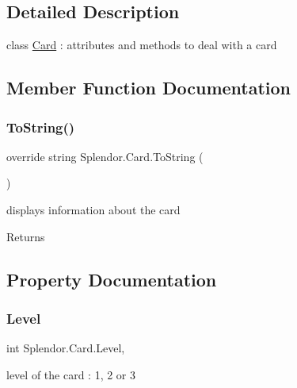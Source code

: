 \subsection{Detailed Description}
class \hyperlink{class_splendor_1_1_card}{Card} \+: attributes and methods to deal with a card 



\subsection{Member Function Documentation}
\mbox{\label{class_splendor_1_1_card_a3403c28ee02b119ee5aae5bd10eee468}} 
\subsubsection{\texorpdfstring{To\+String()}{ToString()}}
{\footnotesize\ttfamily override string Splendor.\+Card.\+To\+String (\begin{DoxyParamCaption}{ }\end{DoxyParamCaption})}



displays information about the card 

\begin{DoxyReturn}{Returns}

\end{DoxyReturn}


\subsection{Property Documentation}
\mbox{\label{class_splendor_1_1_card_aadc9953aeb322c82e04fbd9b5a3b996d}} 
\subsubsection{\texorpdfstring{Level}{Level}}
{\footnotesize\ttfamily int Splendor.\+Card.\+Level\hspace{0.3cm}{\ttfamily [get]}, {\ttfamily [set]}}



level of the card \+: 1, 2 or 3 


